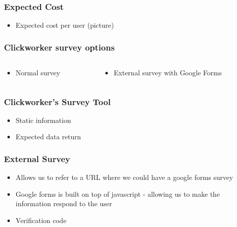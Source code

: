 \begin{frame}
	\frametitle{Expected Cost}
	\begin{itemize}
		\item Expected cost per user (picture)
	\end{itemize}
\end{frame}

\begin{frame}
	\frametitle{Clickworker survey options}
	\begin{columns}
		\begin{column}{0.5\textwidth}
			\begin{itemize}
				\item Normal survey
			\end{itemize}
		\end{column}
		\begin{column}{0.5\textwidth}  %
			\begin{itemize}
				\item External survey with Google Forms
			\end{itemize}
		\end{column}
	\end{columns}
\end{frame}

\begin{frame}
	\frametitle{Clickworker's Survey Tool}
	\begin{itemize}
		\item Static information
		\item Expected data return
	\end{itemize}
\end{frame}

\begin{frame}
	\frametitle{External Survey}
	\begin{itemize}
		\item Allows us to refer to a URL where we could have a google forms survey
		\item Google forms is built on top of javascript - allowing us to make the information respond to the user
		\item Verification code
	\end{itemize}
\end{frame}